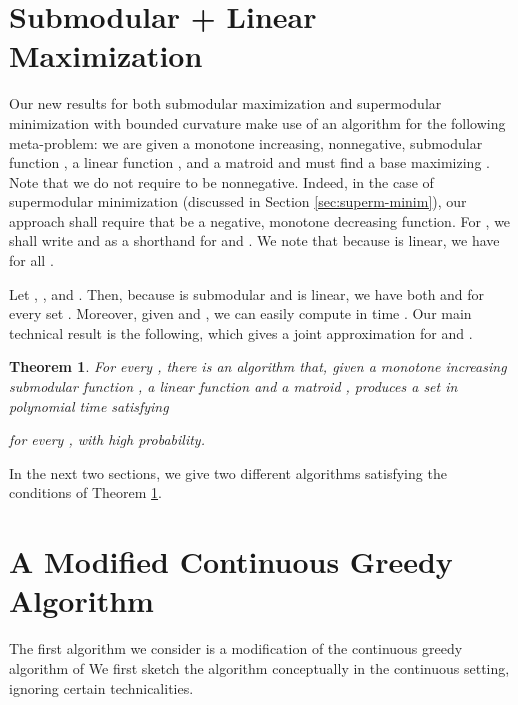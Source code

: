 \documentclass{article}
\newtheorem{theorem}{Theorem}[section]
\theoremstyle{definition}
\begin{document}
\section{Submodular + Linear Maximization}
\label{sec:overv-our-appr}

Our new results for both submodular maximization and supermodular minimization with bounded curvature make use of an algorithm for the following meta-problem: we are given a monotone increasing, nonnegative, submodular function , a linear function , and a matroid   and must find a base  maximizing .  Note that we do not require  to be nonnegative.  Indeed, in the case of supermodular minimization (discussed in Section \ref{sec:superm-minim}), our approach shall require that  be a negative, monotone decreasing function.  For , we shall write  and  as a shorthand for  and .  We note that because  is linear, we have  for all .

Let , , and .  Then, because  is submodular and  is linear, we have both  and  for every set .  Moreover, given  and , we can easily compute  in time .  Our main technical result is the following, which gives a joint approximation for  and .

\begin{theorem}
\label{thm:main}
For every , there is an algorithm that, given a monotone increasing submodular function , a linear function  and a matroid , produces a set  in polynomial time satisfying

for every , with high probability.
\end{theorem}
In the next two sections, we give two different algorithms satisfying the conditions of Theorem \ref{thm:main}.

\section{A Modified Continuous Greedy Algorithm}
\label{sec:cont-greedy}
The first algorithm we consider is a modification of the continuous greedy algorithm of \cite{Calinescu2011}
We first sketch the algorithm conceptually in the continuous setting, ignoring certain technicalities.  
\end{document}
